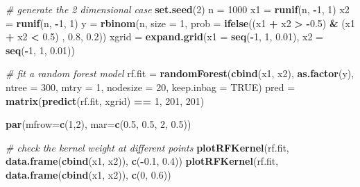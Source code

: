 \documentclass[
]{book}
\newenvironment{Shaded}{\begin{snugshade}}{\end{snugshade}}
\newcommand{\AttributeTok}[1]{\textcolor[rgb]{0.13,0.29,0.53}{#1}}
\newcommand{\CommentTok}[1]{\textcolor[rgb]{0.56,0.35,0.01}{\textit{#1}}}
\newcommand{\ConstantTok}[1]{\textcolor[rgb]{0.56,0.35,0.01}{#1}}
\newcommand{\DecValTok}[1]{\textcolor[rgb]{0.00,0.00,0.81}{#1}}
\newcommand{\FloatTok}[1]{\textcolor[rgb]{0.00,0.00,0.81}{#1}}
\newcommand{\FunctionTok}[1]{\textcolor[rgb]{0.13,0.29,0.53}{\textbf{#1}}}
\newcommand{\NormalTok}[1]{#1}
\newcommand{\OtherTok}[1]{\textcolor[rgb]{0.56,0.35,0.01}{#1}}
\newcommand{\SpecialCharTok}[1]{\textcolor[rgb]{0.81,0.36,0.00}{\textbf{#1}}}
\theoremstyle{definition}
\theoremstyle{definition}
\theoremstyle{definition}
\theoremstyle{definition}
\theoremstyle{remark}
\begin{document}
\begin{Shaded}
\begin{Highlighting}[]
  \CommentTok{\# generate the 2 dimensional case}
  \FunctionTok{set.seed}\NormalTok{(}\DecValTok{2}\NormalTok{)}
\NormalTok{  n }\OtherTok{=} \DecValTok{1000}
\NormalTok{  x1 }\OtherTok{=} \FunctionTok{runif}\NormalTok{(n, }\SpecialCharTok{{-}}\DecValTok{1}\NormalTok{, }\DecValTok{1}\NormalTok{)}
\NormalTok{  x2 }\OtherTok{=} \FunctionTok{runif}\NormalTok{(n, }\SpecialCharTok{{-}}\DecValTok{1}\NormalTok{, }\DecValTok{1}\NormalTok{)}
\NormalTok{  y }\OtherTok{=} \FunctionTok{rbinom}\NormalTok{(n, }\AttributeTok{size =} \DecValTok{1}\NormalTok{, }\AttributeTok{prob =} \FunctionTok{ifelse}\NormalTok{((x1 }\SpecialCharTok{+}\NormalTok{ x2 }\SpecialCharTok{\textgreater{}} \SpecialCharTok{{-}}\FloatTok{0.5}\NormalTok{) }\SpecialCharTok{\&}\NormalTok{ (x1 }\SpecialCharTok{+}\NormalTok{ x2 }\SpecialCharTok{\textless{}} \FloatTok{0.5}\NormalTok{) , }\FloatTok{0.8}\NormalTok{, }\FloatTok{0.2}\NormalTok{))}
\NormalTok{  xgrid }\OtherTok{=} \FunctionTok{expand.grid}\NormalTok{(}\AttributeTok{x1 =} \FunctionTok{seq}\NormalTok{(}\SpecialCharTok{{-}}\DecValTok{1}\NormalTok{, }\DecValTok{1}\NormalTok{, }\FloatTok{0.01}\NormalTok{), }\AttributeTok{x2 =} \FunctionTok{seq}\NormalTok{(}\SpecialCharTok{{-}}\DecValTok{1}\NormalTok{, }\DecValTok{1}\NormalTok{, }\FloatTok{0.01}\NormalTok{))}
  
  \CommentTok{\# fit a random forest model}
\NormalTok{  rf.fit }\OtherTok{=} \FunctionTok{randomForest}\NormalTok{(}\FunctionTok{cbind}\NormalTok{(x1, x2), }\FunctionTok{as.factor}\NormalTok{(y), }\AttributeTok{ntree =} \DecValTok{300}\NormalTok{, }
                        \AttributeTok{mtry =} \DecValTok{1}\NormalTok{, }\AttributeTok{nodesize =} \DecValTok{20}\NormalTok{, }\AttributeTok{keep.inbag =} \ConstantTok{TRUE}\NormalTok{)}
\NormalTok{  pred }\OtherTok{=} \FunctionTok{matrix}\NormalTok{(}\FunctionTok{predict}\NormalTok{(rf.fit, xgrid) }\SpecialCharTok{==} \DecValTok{1}\NormalTok{, }\DecValTok{201}\NormalTok{, }\DecValTok{201}\NormalTok{)}
  
  \FunctionTok{par}\NormalTok{(}\AttributeTok{mfrow=}\FunctionTok{c}\NormalTok{(}\DecValTok{1}\NormalTok{,}\DecValTok{2}\NormalTok{), }\AttributeTok{mar=}\FunctionTok{c}\NormalTok{(}\FloatTok{0.5}\NormalTok{, }\FloatTok{0.5}\NormalTok{, }\DecValTok{2}\NormalTok{, }\FloatTok{0.5}\NormalTok{))}

  \CommentTok{\# check the kernel weight at different points}
  \FunctionTok{plotRFKernel}\NormalTok{(rf.fit, }\FunctionTok{data.frame}\NormalTok{(}\FunctionTok{cbind}\NormalTok{(x1, x2)), }\FunctionTok{c}\NormalTok{(}\SpecialCharTok{{-}}\FloatTok{0.1}\NormalTok{, }\FloatTok{0.4}\NormalTok{))}
  \FunctionTok{plotRFKernel}\NormalTok{(rf.fit, }\FunctionTok{data.frame}\NormalTok{(}\FunctionTok{cbind}\NormalTok{(x1, x2)), }\FunctionTok{c}\NormalTok{(}\DecValTok{0}\NormalTok{, }\FloatTok{0.6}\NormalTok{))}
\end{Highlighting}
\end{Shaded}
\end{document}
